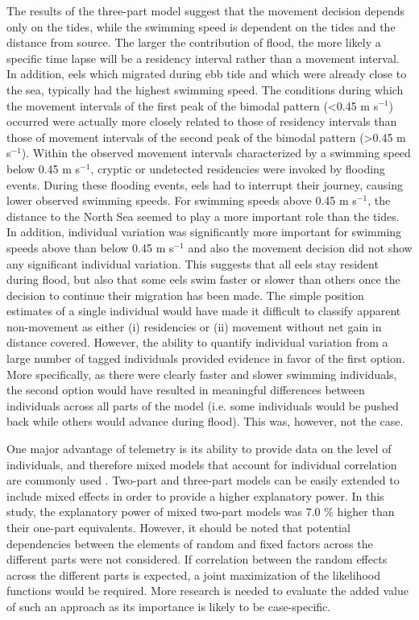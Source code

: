 \documentclass[preprint,12pt,authoryear]{elsarticle}
\begin{document}
The results of the three-part model suggest that the movement decision depends only on the tides, while the swimming speed is dependent on the tides and the distance from source. The larger the contribution of flood, the more likely a specific time lapse will be a residency interval rather than a movement interval. In addition, eels which migrated during ebb tide and which were already close to the sea, typically had the highest swimming speed. The conditions during which the movement intervals of the first peak of the bimodal pattern (<0.45 m s$^{-1}$) occurred were actually more closely related to those of residency intervals than those of movement intervals of the second peak of the bimodal pattern (>0.45 m s$^{-1}$). Within the observed movement intervals characterized by a swimming speed below 0.45 m s$^{-1}$, cryptic or undetected residencies were invoked by flooding events. During these flooding events, eels had to interrupt their journey, causing lower observed swimming speeds. For swimming speeds above 0.45 m s$^{-1}$, the distance to the North Sea seemed to play a more important role than the tides. In addition, individual variation was significantly more important for swimming speeds above than below 0.45 m s$^{-1}$ and also the movement decision did not show any significant individual variation. This suggests that all eels stay resident during flood, but also that some eels swim faster or slower than others once the decision to continue their migration has been made. The simple position estimates of a single individual would have made it difficult to classify apparent non-movement as either (i) residencies or (ii) movement without net gain in distance covered. However, the ability to quantify individual variation from a large number of tagged individuals provided evidence in favor of the first option. More specifically, as there were clearly faster and slower swimming individuals, the second option would have resulted in meaningful differences between individuals across all parts of the model (i.e. some individuals would be pushed back while others would advance during flood). This was, however, not the case. 

One major advantage of telemetry is its ability to provide data on the level of individuals, and therefore mixed models that account for individual correlation are commonly used \citep{Gillies2006ApplicationAnimals,Hooten2017AnimalData}. Two-part and three-part models can be easily extended to include mixed effects in order to provide a higher explanatory power. In this study, the explanatory power of mixed two-part models was 7.0 \% higher than their one-part equivalents. However, it should be noted that potential dependencies between the elements of random and fixed factors across the different parts were not considered. If correlation between the random effects across the different parts is expected, a joint maximization of the likelihood functions would be required. More research is needed to evaluate the added value of such an approach as its importance is likely to be case-specific. 
\end{document}
